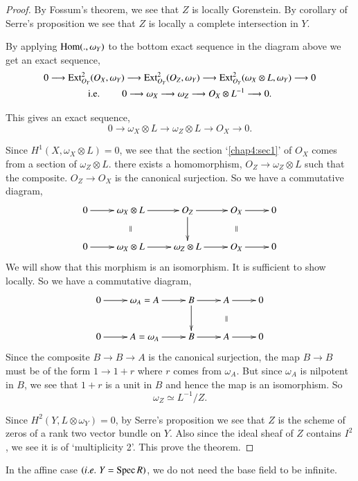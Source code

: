 \begin{proof}
By Fossum's theorem, we see that $Z$ is locally Gorenstein. By
corollary of Serre's proposition we see that $Z$ is locally a complete
intersection in $Y$. 

By applying $\operatorname{Hom}(.,\omega_Y)$ to the bottom exact sequence in the
diagram above we get an exact sequence,
\begin{gather*}
0\longrightarrow\operatorname{Ext}_{O_Y}^2(O_X,\omega_Y)\longrightarrow\operatorname{Ext}_{O_Y}^2
(O_Z, \omega_Y)\longrightarrow\operatorname{Ext}_{O_Y}^2(\omega_X\otimes L,
\omega_Y)\longrightarrow 0\\
\text{{i.e.}\kern.3em}\qquad 0\longrightarrow\omega_X\longrightarrow \omega_Z
\longrightarrow O_X\otimes L^{-1}\longrightarrow 0.
\end{gather*}

This gives an exact sequence,
$$
0\longrightarrow\omega_X\otimes L\longrightarrow\omega_Z\otimes L
\longrightarrow O_X\longrightarrow 0.
$$

Since $H^1(X,\omega_X\otimes L)=0$, we see that the section
`\ref{chap4:sec1}' of $O_X$ comes from a section of $\omega_Z\otimes
L$. \ie there exists a homomorphism, $O_Z\longrightarrow
\omega_Z\otimes L$ such that the composite. $O_Z\longrightarrow O_X$
is the canonical surjection. So we have a commutative diagram, 
\[
\xymatrix{
0\ar[r] & \omega_X\otimes L \ar[r]\ar @{}[d]|{\|} & O_Z\ar[d]\ar[r] &
O_X \ar @{}[d]|{\|} \ar[r] & 0\\
0\ar[r] & \omega_X\otimes L \ar [r] & \omega_Z\otimes L\ar[r] & O_X
\ar[r] & 0  
}
\]
We will show that this morphism is an isomorphism. It is sufficient to
show locally. So we have a commutative diagram, 
\[
\xymatrix{
0\ar[r] & \omega_A=A \ar[r] & B\ar[r] \ar[d] & A\ar[r] \ar
@{}[d]|{\|}& 0\\ 
0\ar[r] & A=\omega_A\ar[r] & B\ar[r] & A\ar[r] & 0
}
\]\pageoriginale
Since the composite $B\longrightarrow B\longrightarrow A$ is the
canonical surjection, the map $B\longrightarrow B$ must be of the form
$1\longrightarrow 1+r$ where $r$ comes from $\omega_A$. But since
$\omega_A$ is nilpotent in $B$, we see that $1+r$ is a unit in $B$ and
hence the map is an isomorphism. So
$$
\omega_Z\simeq L^{-1}/Z.
$$

Since $H^2(Y,L\otimes\omega_Y)=0$, by Serre's proposition we see that
$Z$ is the scheme of zeros of a rank two vector bundle on $Y$. Also
since the ideal sheaf of $Z$ contains $I^2$, we see it is of
`multiplicity 2'. This prove the theorem.
\end{proof}

\begin{Note*}
In the affine case $({i.e.}\kern.3em Y=\operatorname{Spec} R)$, we do not need the base field to
be infinite.
\end{Note*}

